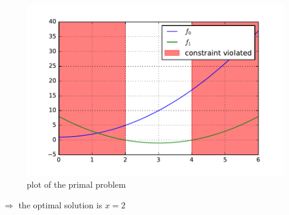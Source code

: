 \begin{figure}[htbp]
\centering
\includegraphics[scale=0.7]{problems/code/prob5_fig.pdf}
\caption{plot of the primal problem}
\end{figure}

$\Rightarrow$ the optimal solution is $x = 2$

